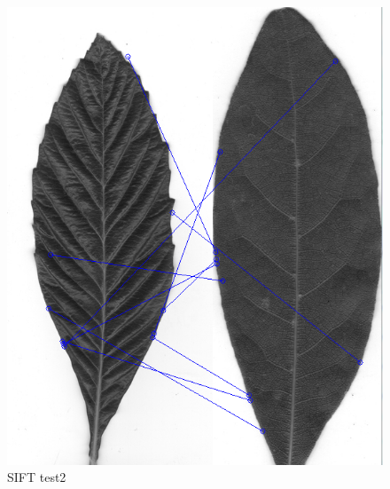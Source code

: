 \documentclass[xcolor=table]{beamer}
\begin{document}
\begin{frame}
\begin{figure}[htbp]
\begin{minipage}[c]{.45\linewidth}
\begin{center}
	\includegraphics[scale=0.20]{Capture.png}
	\caption{SIFT test2}
	\label{figure:Illustration}
      \end{center}
    \end{minipage}
  \end{figure}
\end{frame}
\end{document}
